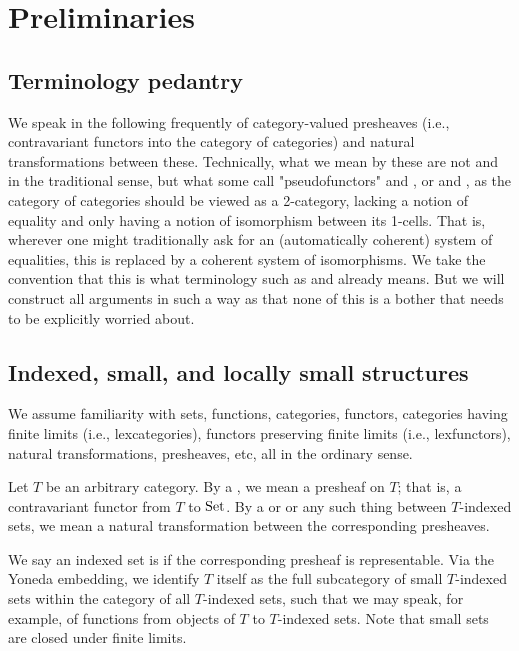 \section{Preliminaries}

\subsection{Terminology pedantry}
We speak in the following frequently of category-valued presheaves (i.e., contravariant functors into the category of categories) and natural transformations between these. Technically, what we mean by these are not  and  in the traditional sense, but what some call "pseudofunctors" and , or  and , as the category of categories should be viewed as a 2-category, lacking a notion of equality and only having a notion of isomorphism between its 1-cells. That is, wherever one might traditionally ask for an (automatically coherent) system of equalities, this is replaced by a coherent system of isomorphisms. We take the convention that this is what terminology such as  and  already means. But we will construct all arguments in such a way as that none of this is a bother that needs to be explicitly worried about. 

\subsection{Indexed, small, and locally small structures}
We assume familiarity with sets, functions, categories, functors, categories having finite limits (i.e., lexcategories), functors preserving finite limits (i.e., lexfunctors), natural transformations, presheaves, etc, all in the ordinary sense.

Let $T$ be an arbitrary category. By a , we mean a presheaf on $T$; that is, a contravariant functor from $T$ to $\mathrm{Set}$. By a  or  or any such thing between $T$-indexed sets, we mean a natural transformation between the corresponding presheaves.

We say an indexed set is  if the corresponding presheaf is representable. Via the Yoneda embedding, we identify $T$ itself as the full subcategory of small $T$-indexed sets within the category of all $T$-indexed sets, such that we may speak, for example, of functions from objects of $T$ to $T$-indexed sets. Note that small sets are closed under finite limits.

